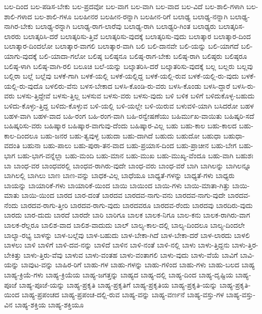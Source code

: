 {ಬಲ-ದಿಂದ
ಬಲ-ಪಡಿಸ-ಬೇಕು
ಬಲ-ಪ್ರದವೋ
ಬಲ-ವಾಗ
ಬಲ-ವಾಗಿ
ಬಲ-ವಾದ
ಬಲ-ವಿದೆ
ಬಲ-ಶಾಲಿ-ಗಳಾಗಿ
ಬಲ-ಶಾಲಿ-ಗಳಾದ
ಬಲ-ಶಾಲಿ-ಗಳೂ
ಬಲಹೀನರ
ಬಲಹೀನ-ರನ್ನಾಗಿ
ಬಲಹೀನ-ರಿಗೆ
ಬಲಾಢ್ಯ
ಬಲಾಢ್ಯ-ನನ್ನಾಗಿ
ಬಲಾಢ್ಯ-ನಾಗಿರ-ಬೇಕು
ಬಲಾಢ್ಯ-ರನ್ನಾಗಿ
ಬಲಾಢ್ಯ-ರಾಗ-ಲಾರೆವು
ಬಲಾಢ್ಯ-ರಾಗಿ
ಬಲಾಢ್ಯರಿ-ಗಿಂತ
ಬಲಾಢ್ಯರು
ಬಲಾತ್ಕರಿಸ-ಲಾರರು
ಬಲಾತ್ಕರಿಸಿ-ದರೆ
ಬಲಾತ್ಕರಿಸು-ತ್ತಿವೆ
ಬಲಾತ್ಕರಿಸು-ವುದಕ್ಕೆ
ಬಲಾತ್ಕರಿಸು-ವುದು
ಬಲಾತ್ಕಾರ
ಬಲಾತ್ಕಾರ-ದಿಂದ
ಬಲಾತ್ಕಾರ-ದಿಂದಲೋ
ಬಲಾತ್ಕಾರ-ವಾಗಲಿ
ಬಲಾತ್ಕಾರ-ವಾಗಿ
ಬಲಿ
ಬಲಿ-ದಾನವೇ
ಬಲಿ-ಯನ್ನು
ಬಲಿ-ಯಾಗದೆ
ಬಲಿ-ಯಾಗು-ವುದಕ್ಕೆ
ಬಲಿ-ಯಾದಾ-ಗಲೋ
ಬಲಿಷ್ಠ
ಬಲಿಷ್ಠನೂ
ಬಲಿಷ್ಠ-ರಾಗ-ಬೇಕು
ಬಲಿಷ್ಠ-ರಾಗಿ
ಬಲಿಷ್ಠರು
ಬಲಿಷ್ಠರೂ
ಬಲಿಷ್ಠ-ಳಾಗಿ
ಬಲಿಷ್ಠ-ವಾಗಿ-ರಲಿ
ಬಲೂಚಿ
ಬಲೆ-ಯನ್ನು
ಬಲ್ಕಾತರಿಸಿ-ದರೆ
ಬಲ್ಕಾತರಿಸು-ವುದಕ್ಕೆ
ಬಲ್ಲ
ಬಲ್ಲರು
ಬಲ್ಲವು
ಬಲ್ಲಿರಾ
ಬಲ್ಲೆ
ಬಲ್ಲೆವು
ಬಳಕೆ-ಗಾಗಿ
ಬಳಕೆ-ಯಲ್ಲಿ
ಬಳಕೆ-ಯಲ್ಲಿದ್ದ
ಬಳಕೆ-ಯಲ್ಲಿ-ರುವ
ಬಳಕೆ-ಯಲ್ಲಿ-ರು-ವುದು
ಬಳಕೆ-ಯಲ್ಲಿ-ರು-ವುದೊ
ಬಳಲಿರು-ವೆನು
ಬಳಸ-ಬೇಕಾದ
ಬಳಸಿ-ಕೊಂಡಿ-ರು-ವರು
ಬಳಸಿ-ಕೊಂಡು
ಬಳಸಿ-ದ್ದಾರೆ
ಬಳಸಿ-ರು-ವರು
ಬಳಸು-ತ್ತಿದ್ದೇವೆ
ಬಳಸು-ತ್ತಿಲ್ಲ
ಬಳಸುವ
ಬಳಸು-ವರು
ಬಳಸು-ವುದು
ಬಳಿ
ಬಳಿಕ
ಬಳಿಗೆ
ಬಳಿದುಕೊಳ್ಳ-ಬಹುದು
ಬಳಿದು-ಕೊಳ್ಳು-ತ್ತಿದ್ದ
ಬಳಿದು-ಕೊಳ್ಳುವ
ಬಳಿ-ಯಲ್ಲಿ
ಬಳಿ-ಯಲ್ಲೇ
ಬಳಿ-ಯಿರುವ
ಬಳುವಳಿ-ಯಾಗಿ
ಬಸಿದರೋ
ಬಹಳ
ಬಹಳ-ವಾಗಿ
ಬಹಳ-ವಾದ
ಬಹಿ-ರಂಗ
ಬಹಿ-ರಂಗ-ವಾಗಿ
ಬಹಿ-ರನ್ವೇಷಣೆಯು
ಬಹಿರ್ಮುಖ-ವಾಯಿತು
ಬಹಿಷ್ಕರಿ-ಸದೆ
ಬಹಿಷ್ಕರಿಸು-ವರು
ಬಹಿಷ್ಕಾರ
ಬಹಿಷ್ಕಾರ-ವಾಗುವು-ದೆಂದು
ಬಹಿಷ್ಕಾರ-ವಿಲ್ಲ
ಬಹು
ಬಹು-ಕಾಲ
ಬಹು-ಕಾಲದ
ಬಹು-ಕಾಲ-ದಿಂದಲೂ
ಬಹು-ಜನರ
ಬಹು-ತ್ವವುಳ್ಳ
ಬಹುದಾ
ಬಹು-ದಾಗಿದೆ
ಬಹುದು
ಬಹುದೋ
ಬಹುಧಾ
ಬಹುಧಾ-ವದಂತಿ
ಬಹುನಾ
ಬಹು-ಪಾಲು
ಬಹು-ಪುರಾ-ತನ-ವಾದ
ಬಹು-ಪ್ರಯಾಸ-ದಿಂದ
ಬಹು-ಪ್ರಾಚೀನ
ಬಹು-ಬೇಗ
ಬಹು-ಭಾಗ
ಬಹು-ಭಾಗ-ವನ್ನೆಲ್ಲಾ
ಬಹು-ಮಂದಿ
ಬಹು-ಮಾನ
ಬಹು-ಮುಖ
ಬಹು-ಮುಖ್ಯ-ವೆಂದೂ
ಬಹು-ವಾಗಿ
ಬಹುಶಃ
ಬಾ
ಬಾಂಧ-ವರ
ಬಾಂಧವರಲ್ಲಿ
ಬಾಂಧವ-ರಾಗಿರು-ವುದೇ
ಬಾಂಧ-ವರು
ಬಾಂಧ-ವರೆ
ಬಾಗಿ
ಬಾಗಿಲನ್ನು
ಬಾಗಿಲನ್ನೂ
ಬಾಗಿಲಲ್ಲಿ
ಬಾಗಿಲು
ಬಾಣ
ಬಾಣ-ವನ್ನು
ಬಾಧಕ-ವಿಲ್ಲ
ಬಾಧೆಯೂ
ಬಾಧ್ಯತೆ-ಗಳನ್ನು
ಬಾಧ್ಯತೆ-ಗಳು
ಬಾಧ್ಯರು
ಬಾಯನ್ನು
ಬಾಯಾರಿಕೆ-ಗಳು
ಬಾಯಾರಿಕೆ-ಯಿಂದ
ಬಾಯಿ
ಬಾಯಿಂದ
ಬಾಯಿ-ಗಳು
ಬಾಯಿ-ಮಾತಾ-ಗಿತ್ತು
ಬಾಯಿ-ಮಾತು
ಬಾಯಿ-ಯಿಂದ
ಬಾರದ
ಬಾರ-ದಂತೆ
ಬಾರದವ
ಬಾರದವ-ನಾಗು-ವನು
ಬಾರದವ-ನಾಗು-ವುದೇ
ಬಾರದವ-ನೆಂದು
ಬಾರದವ-ರಾಗು-ತ್ತೀರಿ
ಬಾರದವ-ರಾಗು-ವುದು
ಬಾರದವರೂ
ಬಾರದವ-ರೆಂದು
ಬಾರದವು
ಬಾರದಿರು-ವುದು
ಬಾರದು
ಬಾರ-ದುದು
ಬಾರದೆ
ಬಾರದೇ
ಬಾರಿ
ಬಾರಿಗೂ
ಬಾಲಕ
ಬಾಲಕ-ನಿಗೂ
ಬಾಲ-ಕನು
ಬಾಲಕ-ರಾಗಿರು-ವಾಗ
ಬಾಲಕ-ರೆಲ್ಲರೂ
ಬಾಲಿಶ-ವಾದ
ಬಾಲಿಶ-ವಾದುದು
ಬಾಲ್
ಬಾಲ್ಯ-ಕಾಲ-ದಲ್ಲಿ
ಬಾಲ್ಯ-ದಿಂದಲೂ
ಬಾಲ್ಯ-ದಿಂದಲೇ
ಬಾಲ್ಯಾ-ರಭ್ಯ
ಬಾಳನ್ನು
ಬಾಳ-ಬಲ್ಲೆವು
ಬಾಳ-ಬಹುದು
ಬಾಳ-ಬೇಕಾ-ಗಿದೆ
ಬಾಳ-ಬೇಕಾ-ದರೆ
ಬಾಳ-ಲಾರದು
ಬಾಳಲಿ
ಬಾಳಲು
ಬಾಳಿ
ಬಾಳಿಗೆ
ಬಾಳಿ-ದವ-ನನ್ನು
ಬಾಳಿದೆ
ಬಾಳಿನ
ಬಾಳಿ-ನಂತೆ
ಬಾಳಿ-ನಲ್ಲಿ
ಬಾಳು
ಬಾಳು-ತ್ತಿದ್ದನು
ಬಾಳು-ತ್ತಿರ-ಬೇಕಿತ್ತು
ಬಾಳು-ತ್ತಿರು-ವೆವು
ಬಾಳುವ
ಬಾಳು-ವಂತಹ
ಬಾಳು-ವಂತಾಗಲಿ
ಬಾಳು-ವುದು
ಬಾಳು-ವೆಯೆ
ಬಾವಿಗೆ
ಬಾವಿ-ಯನ್ನು
ಬಾವುಟ-ವನ್ನು
ಬಾಹಿರ-ರಿಗೆ
ಬಾಹು-ಗಳ
ಬಾಹು-ಗಳನ್ನು
ಬಾಹು-ಗಳಿಂದ
ಬಾಹು-ಗಳು
ಬಾಹು-ಬಲದ
ಬಾಹ್ಯ
ಬಾಹ್ಯ-ಕ್ರಿಯೆ-ಗಳು
ಬಾಹ್ಯ-ಕ್ರಿಯೆಯ
ಬಾಹ್ಯ-ಜಗತ್ತನ್ನು
ಬಾಹ್ಯದ
ಬಾಹ್ಯ-ದಲ್ಲಿ
ಬಾಹ್ಯ-ದಿಂದ
ಬಾಹ್ಯ-ದೃಷ್ಟಿಯ
ಬಾಹ್ಯ-ಪೂಜೆ
ಬಾಹ್ಯ-ಪೂಜೆ-ಯನ್ನು
ಬಾಹ್ಯ-ಪ್ರಕೃತಿ
ಬಾಹ್ಯ-ಪ್ರಕೃತಿಗೆ
ಬಾಹ್ಯ-ಪ್ರಕೃತಿಯ
ಬಾಹ್ಯ-ಪ್ರಕೃತಿ-ಯನ್ನು
ಬಾಹ್ಯ-ಪ್ರಕೃತಿ-ಯಿಂದ
ಬಾಹ್ಯ-ಪ್ರಪಂಚದ
ಬಾಹ್ಯ-ಪ್ರಪಂಚ-ದಲ್ಲಿ-ರುವ
ಬಾಹ್ಯ-ವನ್ನು
ಬಾಹ್ಯ-ವರ್ಣನೆ
ಬಾಹ್ಯ-ವಸ್ತು-ಗಳ
ಬಾಹ್ಯ-ವಸ್ತು-ವಿನ
ಬಾಹ್ಯ-ಶಕ್ತಿಯ
ಬಾಹ್ಯ-ಶಕ್ತಿಯೂ
}
